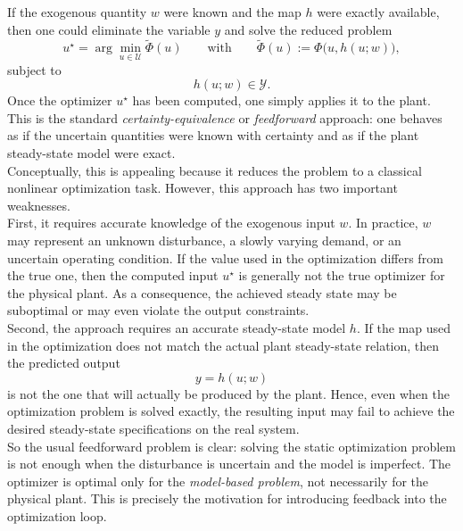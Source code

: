 If the exogenous quantity $w$ were known and the map $h$ were exactly available, then one could eliminate the variable $y$ and solve the reduced problem
\[
u^\star = \arg\min_{u \in \mathcal U} \tilde \Phi(u)
\qquad
\text{with}
\qquad
\tilde \Phi(u) := \Phi\bigl(u,h(u;w)\bigr),
\]
subject to
\[
h(u;w) \in \mathcal Y.
\]
Once the optimizer $u^\star$ has been computed, one simply applies it to the plant. This is the standard \emph{certainty-equivalence} or \emph{feedforward} approach: one behaves as if the uncertain quantities were known with certainty and as if the plant steady-state model were exact.\\

Conceptually, this is appealing because it reduces the problem to a classical nonlinear optimization task. However, this approach has two important weaknesses.\\
First, it requires accurate knowledge of the exogenous input $w$. In practice, $w$ may represent an unknown disturbance, a slowly varying demand, or an uncertain operating condition. If the value used in the optimization differs from the true one, then the computed input $u^\star$ is generally not the true optimizer for the physical plant. As a consequence, the achieved steady state may be suboptimal or may even violate the output constraints.\\

Second, the approach requires an accurate steady-state model $h$. If the map used in the optimization does not match the actual plant steady-state relation, then the predicted output
\[
y = h(u;w)
\]
is not the one that will actually be produced by the plant. Hence, even when the optimization problem is solved exactly, the resulting input may fail to achieve the desired steady-state specifications on the real system.\\

So the usual feedforward problem is clear: solving the static optimization problem is not enough when the disturbance is uncertain and the model is imperfect. The optimizer is optimal only for the \emph{model-based problem}, not necessarily for the physical plant. This is precisely the motivation for introducing feedback into the optimization loop.

